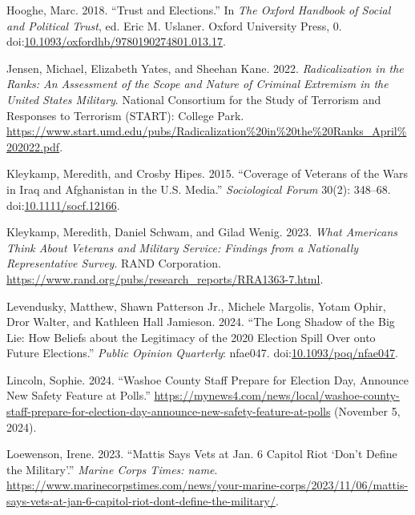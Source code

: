 \documentclass[
  12pt,
  letterpaper,
]{article}
\newlength{\cslhangindent}
\newenvironment{CSLReferences}[2] %
 {\begin{list}{}{%
  \setlength{\itemindent}{0pt}
  \setlength{\leftmargin}{0pt}
  \setlength{\parsep}{0pt}
  \ifodd #1
   \setlength{\leftmargin}{\cslhangindent}
   \setlength{\itemindent}{-1\cslhangindent}
  \fi
  \setlength{\itemsep}{#2\baselineskip}}}
 {\end{list}}
\begin{document}
\begin{CSLReferences}{1}{1}
Hooghe, Marc. 2018. {``Trust and {Elections}.''} In \emph{The {Oxford
Handbook} of {Social} and {Political Trust}}, ed. Eric M. Uslaner.
Oxford University Press, 0.
doi:\href{https://doi.org/10.1093/oxfordhb/9780190274801.013.17}{10.1093/oxfordhb/9780190274801.013.17}.

Jensen, Michael, Elizabeth Yates, and Sheehan Kane. 2022.
\emph{Radicalization in the {Ranks}: {An Assessment} of the {Scope} and
{Nature} of {Criminal Extremism} in the {United States Military}}.
{National Consortium for the Study of Terrorism and Responses to
Terrorism (START): College Park}.
\url{https://www.start.umd.edu/pubs/Radicalization\%20in\%20the\%20Ranks_April\%202022.pdf}.

Kleykamp, Meredith, and Crosby Hipes. 2015. {``Coverage of {Veterans} of
the {Wars} in {Iraq} and {Afghanistan} in the {U}.{S}. {Media}.''}
\emph{Sociological Forum} 30(2): 348--68.
doi:\href{https://doi.org/10.1111/socf.12166}{10.1111/socf.12166}.

Kleykamp, Meredith, Daniel Schwam, and Gilad Wenig. 2023. \emph{What
{Americans Think About Veterans} and {Military Service}: {Findings} from
a {Nationally Representative Survey}}. RAND Corporation.
\url{https://www.rand.org/pubs/research_reports/RRA1363-7.html}.

Levendusky, Matthew, Shawn Patterson Jr., Michele Margolis, Yotam Ophir,
Dror Walter, and Kathleen Hall Jamieson. 2024. {``The {Long Shadow} of
the {Big Lie}: {How Beliefs} about the {Legitimacy} of the 2020
{Election Spill Over} onto {Future Elections}.''} \emph{Public Opinion
Quarterly}: nfae047.
doi:\href{https://doi.org/10.1093/poq/nfae047}{10.1093/poq/nfae047}.

Lincoln, Sophie. 2024. {``Washoe {County} Staff Prepare for {Election
Day}, Announce New Safety Feature at Polls.''}
\url{https://mynews4.com/news/local/washoe-county-staff-prepare-for-election-day-announce-new-safety-feature-at-polls}
(November 5, 2024).

Loewenson, Irene. 2023. {``Mattis Says Vets at {Jan}. 6 {Capitol} Riot
{`Don't Define the Military'}.''} \emph{Marine Corps Times: name}.
\url{https://www.marinecorpstimes.com/news/your-marine-corps/2023/11/06/mattis-says-vets-at-jan-6-capitol-riot-dont-define-the-military/}.


\end{CSLReferences}
\end{document}

